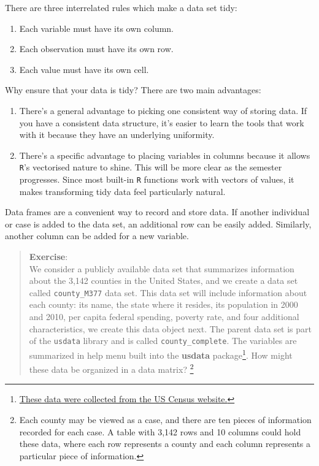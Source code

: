 \documentclass[
]{book}
\providecommand{\tightlist}{%
  \setlength{\itemsep}{0pt}\setlength{\parskip}{0pt}}
\begin{document}
There are three interrelated rules which make a data set tidy:

\begin{enumerate}
\def\labelenumi{\arabic{enumi}.}
\tightlist
\item
  Each variable must have its own column.\\
\item
  Each observation must have its own row.\\
\item
  Each value must have its own cell.
\end{enumerate}

Why ensure that your data is tidy? There are two main advantages:

\begin{enumerate}
\def\labelenumi{\arabic{enumi}.}
\item
  There's a general advantage to picking one consistent way of storing data. If you have a consistent data structure, it's easier to learn the tools that work with it because they have an underlying uniformity.
\item
  There's a specific advantage to placing variables in columns because it allows \texttt{R}'s vectorised nature to shine. This will be more clear as the semester progresses. Since most built-in \texttt{R} functions work with vectors of values, it makes transforming tidy data feel particularly natural.
\end{enumerate}

Data frames are a convenient way to record and store data. If another individual or case is added to the data set, an additional row can be easily added. Similarly, another column can be added for a new variable.

\begin{quote}
\textbf{Exercise}:\\
We consider a publicly available data set that summarizes information about the 3,142 counties in the United States, and we create a data set called \texttt{county\_M377} data set. This data set will include information about each county: its name, the state where it resides, its population in 2000 and 2010, per capita federal spending, poverty rate, and four additional characteristics, we create this data object next. The parent data set is part of the \texttt{usdata} library and is called \texttt{county\_complete}. The variables are summarized in help menu built into the \textbf{usdata} package\footnote{\href{http://quickfacts.census.gov/qfd/index.html}{These data were collected from the US Census website.}}. How might these data be organized in a data matrix? \footnote{Each county may be viewed as a case, and there are ten pieces of information recorded for each case. A table with 3,142 rows and 10 columns could hold these data, where each row represents a county and each column represents a particular piece of information.}
\end{quote}
\end{document}
